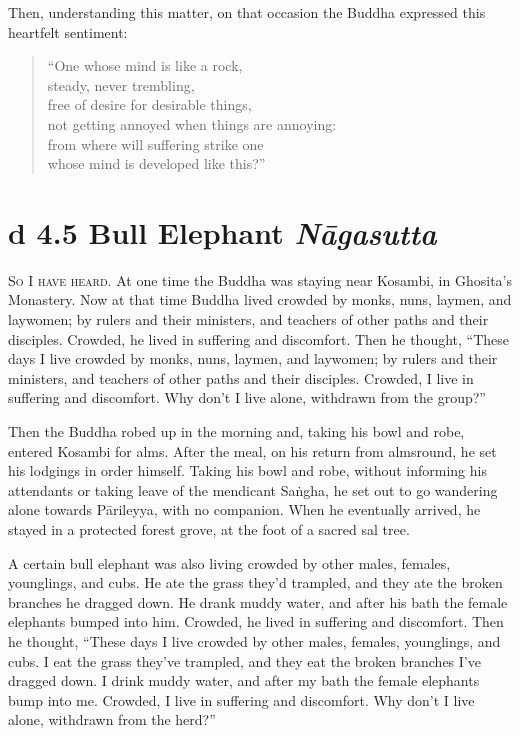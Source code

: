 \documentclass[12pt,openany]{book}%
\newcommand*{\suttatitleacronym}[1]{\smaller[2]{#1}\vspace*{.3em}}
\newcommand*{\suttatitletranslation}[1]{\linebreak{#1}}
\newcommand*{\suttatitleroot}[1]{\linebreak\smaller[2]\itshape{#1}}
\newcommand*{\tocacronym}[1]{\hspace*{-3.3em}{#1}\quad}
\newcommand*{\toctranslation}[1]{#1}
\newcommand*{\tocroot}[1]{(\textit{#1})}
\newcommand*{\scevam}[1]{\textsc{#1}}
\begin{document}
Then, understanding this matter, on that occasion the Buddha expressed this heartfelt sentiment: 

\begin{verse}%
“One whose mind is like a rock, \\
steady, never trembling, \\
free of desire for desirable things, \\
not getting annoyed when things are annoying: \\
from where will suffering strike one \\
whose mind is developed like this?” 

%
\end{verse}

%
\section*{{\suttatitleacronym Ud 4.5}{\suttatitletranslation A Bull Elephant }{\suttatitleroot Nāgasutta}}
\addcontentsline{toc}{section}{\tocacronym{Ud 4.5} \toctranslation{A Bull Elephant } \tocroot{Nāgasutta}}

\scevam{So I have heard. }At one time the Buddha was staying near Kosambi, in Ghosita’s Monastery. Now at that time Buddha lived crowded by monks, nuns, laymen, and laywomen; by rulers and their ministers, and teachers of other paths and their disciples. Crowded, he lived in suffering and discomfort. Then he thought, “These days I live crowded by monks, nuns, laymen, and laywomen; by rulers and their ministers, and teachers of other paths and their disciples. Crowded, I live in suffering and discomfort. Why don’t I live alone, withdrawn from the group?” 

Then the Buddha robed up in the morning and, taking his bowl and robe, entered Kosambi for alms. After the meal, on his return from almsround, he set his lodgings in order himself. Taking his bowl and robe, without informing his attendants or taking leave of the mendicant \textsanskrit{Saṅgha}, he set out to go wandering alone towards \textsanskrit{Pārileyya}, with no companion. When he eventually arrived, he stayed in a protected forest grove, at the foot of a sacred sal tree. 

A certain bull elephant was also living crowded by other males, females, younglings, and cubs. He ate the grass they’d trampled, and they ate the broken branches he dragged down. He drank muddy water, and after his bath the female elephants bumped into him. Crowded, he lived in suffering and discomfort. Then he thought, “These days I live crowded by other males, females, younglings, and cubs. I eat the grass they’ve trampled, and they eat the broken branches I’ve dragged down. I drink muddy water, and after my bath the female elephants bump into me. Crowded, I live in suffering and discomfort. Why don’t I live alone, withdrawn from the herd?” 
\end{document}

